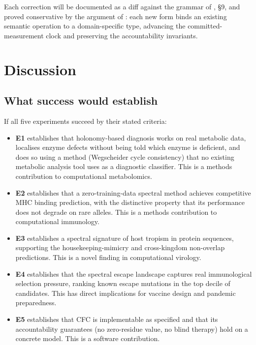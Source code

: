 \documentclass[11pt,a4paper]{article}
\theoremstyle{expthm}
\theoremstyle{definition}
\theoremstyle{remark}
\begin{document}
Each correction will be documented as a diff against the grammar of
\citep{sachikonye2026cfc}, \S9, and proved conservative by the argument
of : each new form binds an existing
semantic operation to a domain-specific type, advancing the
committed-measurement clock and preserving the accountability
invariants.

\section{Discussion}
\label{sec:discussion}

\subsection{What success would establish}

If all five experiments succeed by their stated criteria:

\begin{itemize}[leftmargin=1.4em,itemsep=2pt]
\item \textbf{E1} establishes that holonomy-based diagnosis works on real
  metabolic data, localises enzyme defects without being told which
  enzyme is deficient, and does so using a method (Wegscheider cycle
  consistency) that no existing metabolic analysis tool uses as a
  diagnostic classifier. This is a methods contribution to computational
  metabolomics.
\item \textbf{E2} establishes that a zero-training-data spectral method
  achieves competitive MHC binding prediction, with the distinctive
  property that its performance does not degrade on rare alleles. This is
  a methods contribution to computational immunology.
\item \textbf{E3} establishes a spectral signature of host tropism in
  protein sequences, supporting the housekeeping-mimicry and
  cross-kingdom non-overlap predictions. This is a novel finding in
  computational virology.
\item \textbf{E4} establishes that the spectral escape landscape captures
  real immunological selection pressure, ranking known escape mutations
  in the top decile of candidates. This has direct implications for
  vaccine design and pandemic preparedness.
\item \textbf{E5} establishes that CFC is implementable as specified and
  that its accountability guarantees (no zero-residue value, no blind
  therapy) hold on a concrete model. This is a software contribution.
\end{itemize}
\end{document}

